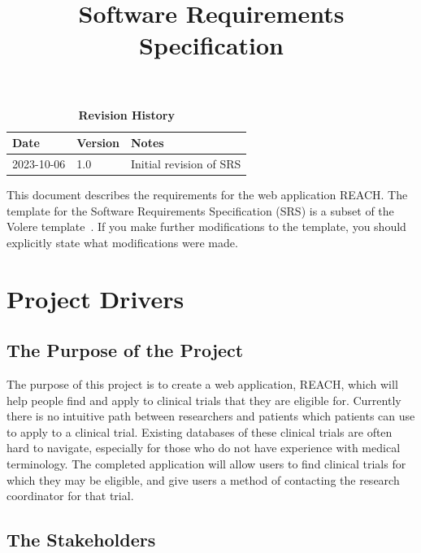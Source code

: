 \documentclass[12pt, titlepage]{article}
\title{Software Requirements Specification\\\progname}
\author{\authname}
\date{}
\begin{document}
\maketitle

\tableofcontents
\listoftables
\listoffigures

\begin{table}[bp]
\caption{\bf Revision History}
\begin{tabularx}{\textwidth}{p{3cm}p{2cm}X}
\toprule {\bf Date} & {\bf Version} & {\bf Notes}\\
\midrule
2023-10-06 & 1.0 & Initial revision of SRS\\
\bottomrule
\end{tabularx}
\end{table}

\newpage


This document describes the requirements for the web application REACH. The template for the Software
Requirements Specification (SRS) is a subset of the Volere
template~\citep{RobertsonAndRobertson2012}.  If you make further modifications
to the template, you should explicitly state what modifications were made.

\section{Project Drivers}

\subsection{The Purpose of the Project}

The purpose of this project is to create a web application, REACH, which will help people find and apply to clinical trials that they are eligible for. Currently there is no intuitive path between researchers and patients which patients can use to apply to a clinical trial. Existing databases of these clinical trials are often hard to navigate, especially for those who do not have experience with medical terminology. The completed application will allow users to find clinical trials for which they may be eligible, and give users a method of contacting the research coordinator for that trial.

\subsection{The Stakeholders}
\end{document}
